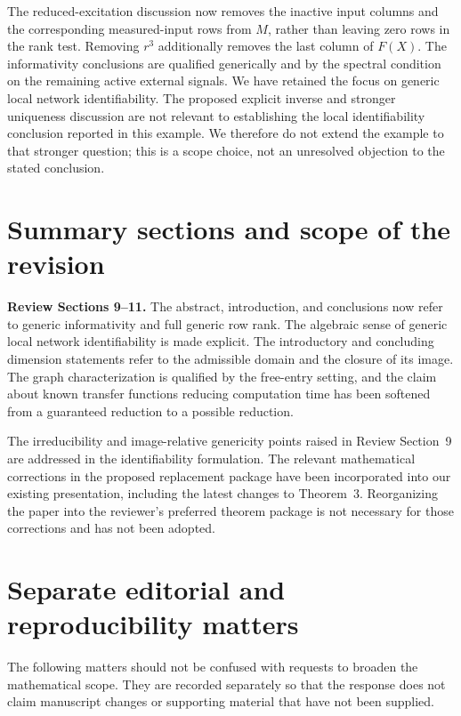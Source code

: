 \documentclass[11pt]{article}
\begin{document}
The reduced-excitation discussion now removes the inactive input columns and
the corresponding measured-input rows from $M$, rather than leaving zero rows
in the rank test. Removing $r^3$ additionally removes the last column of $F(X)$.
The informativity conclusions are qualified generically and by the spectral
condition on the remaining active external signals. We have retained the focus
on generic local network identifiability. The proposed explicit inverse and
stronger uniqueness discussion are not relevant to establishing the local
identifiability conclusion reported in this example. We therefore do not extend
the example to that stronger question; this is a scope choice, not an unresolved
objection to the stated conclusion.

\section{Summary sections and scope of the revision}
\textbf{Review Sections 9--11.}
The abstract, introduction, and conclusions now refer to generic informativity
and full generic row rank. The algebraic sense of generic local network
identifiability is made explicit. The introductory and concluding dimension
statements refer to the admissible domain and the closure of its image. The
graph characterization is qualified by the free-entry setting, and the claim
about known transfer functions reducing computation time has been softened
from a guaranteed reduction to a possible reduction.

The irreducibility and image-relative genericity points raised in Review
Section~9 are addressed in the identifiability formulation. The relevant
mathematical corrections in the proposed replacement package have been
incorporated into our existing presentation, including the latest changes to
Theorem~3. Reorganizing the paper into the reviewer's preferred theorem package
is not necessary for those corrections and has not been adopted.

\section*{Separate editorial and reproducibility matters}
The following matters should not be confused with requests to broaden the
mathematical scope. They are recorded separately so that the response does not
claim manuscript changes or supporting material that have not been supplied.
\end{document}
